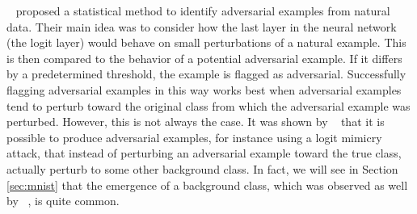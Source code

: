 



~\cite{roth19aodds} proposed a statistical method to identify adversarial examples from natural data. Their main idea was to consider how the last layer in the neural network (the logit layer) would behave on small perturbations of a natural example. %
This is then compared to the behavior of a potential adversarial example. If it differs by a predetermined threshold, the example is flagged as adversarial. Successfully flagging adversarial examples in this way works best when adversarial examples tend to perturb toward the original class from which the adversarial example was perturbed. However, this is not always the case.
It was shown by ~\cite{hosseini2019odds} that it is possible to produce adversarial examples, for instance using a logit mimicry attack, that instead of perturbing an adversarial example toward the true class, actually perturb to some other background class. In fact, we will see in Section \ref{sec:mnist} that the emergence of a background class, which was observed as well by ~\cite{roth19aodds}, is quite common. 

